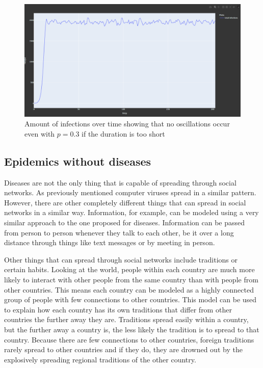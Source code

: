 \begin{figure}[!ht]
    \centering
    \includegraphics[width=0.75\linewidth]{images/no_oscillation2.png}
    \caption{Amount of infections over time showing that no oscillations occur even with $p = 0.3$ if the duration is too short}
    \label{fig:no_oscillation2}
\end{figure}
\clearpage

\subsection{Epidemics without diseases}
Diseases are not the only thing that is capable of spreading through social networks. As
previously mentioned computer viruses spread in a similar pattern. However, there are other
completely different things that can spread in social networks in a similar way.
Information, for example, can be modeled using a very similar approach to the one proposed
for diseases. Information can be passed from person to person whenever they talk to each other,
be it over a long distance through things like text messages or by meeting in person.

Other things that can spread through social networks include traditions or certain habits.
Looking at the world, people within each country are much more likely to interact with other people from the same country than with people from other countries. This means each
country can be modeled as a highly connected group of people with few connections to other
countries. This model can be used to explain how each country has its own traditions that
differ from other countries the further away they are. Traditions spread easily within 
a country, but the further away a country is, the less likely the tradition is to spread to that country.
Because there are few connections to other countries, foreign traditions rarely spread to other countries and if they do, they are drowned out by the explosively spreading regional traditions of the other country.

